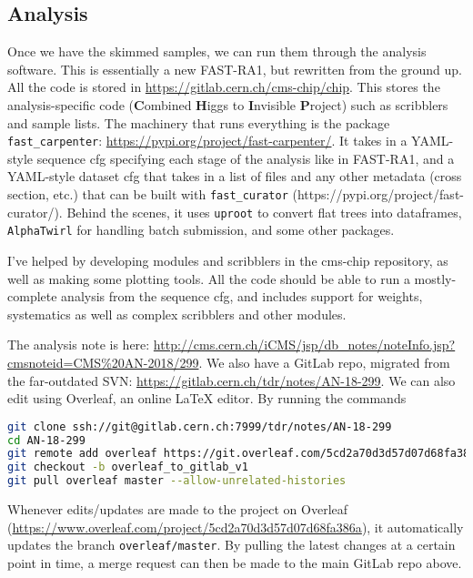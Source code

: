 \subsection{Analysis}

Once we have the skimmed samples, we can run them through the analysis software. This is essentially a new FAST-RA1, but rewritten from the ground up. All the code is stored in \url{https://gitlab.cern.ch/cms-chip/chip}. This stores the analysis-specific code (\textbf{C}ombined \textbf{H}iggs to \textbf{I}nvisible \textbf{P}roject) such as scribblers and sample lists. The machinery that runs everything is the package \texttt{fast\_carpenter}: \url{https://pypi.org/project/fast-carpenter/}. It takes in a YAML-style sequence cfg specifying each stage of the analysis like in FAST-RA1, and a YAML-style dataset cfg that takes in a list of files and any other metadata (cross section, etc.) that can be built with \texttt{fast\_curator} (https://pypi.org/project/fast-curator/). Behind the scenes, it uses \texttt{uproot} to convert flat trees into dataframes, \texttt{AlphaTwirl} for handling batch submission, and some other packages.

I've helped by developing modules and scribblers in the cms-chip repository, as well as making some plotting tools. All the code should be able to run a mostly-complete analysis from the sequence cfg, and includes support for weights, systematics as well as complex scribblers and other modules.

The analysis note is here: \url{http://cms.cern.ch/iCMS/jsp/db_notes/noteInfo.jsp?cmsnoteid=CMS%20AN-2018/299}. We also have a GitLab repo, migrated from the far-outdated SVN: \url{https://gitlab.cern.ch/tdr/notes/AN-18-299}. We can also edit using Overleaf, an online LaTeX editor. By running the commands

\begin{lstlisting}[belowskip=-0.7cm, language=sh, numbers=none]
git clone ssh://git@gitlab.cern.ch:7999/tdr/notes/AN-18-299
cd AN-18-299
git remote add overleaf https://git.overleaf.com/5cd2a70d3d57d07d68fa386a
git checkout -b overleaf_to_gitlab_v1
git pull overleaf master --allow-unrelated-histories
\end{lstlisting}

Whenever edits/updates are made to the project on Overleaf (\url{https://www.overleaf.com/project/5cd2a70d3d57d07d68fa386a}), it automatically updates the branch \texttt{overleaf/master}. By pulling the latest changes at a certain point in time, a merge request can then be made to the main GitLab repo above.

